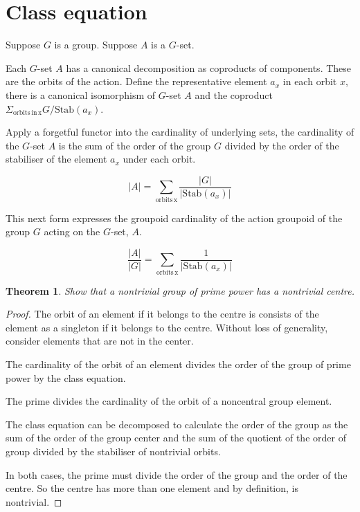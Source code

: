\documentclass{tufte-book}
\newtheorem{theorem}{Theorem}
\begin{document}
\section{Class equation}


Suppose $G$ is a group. Suppose $A$ is a $G$-set.

Each $G$-set $A$ has a canonical decomposition as coproducts of components. These are the orbits of the action. Define the representative element $a_x$ in each orbit $x$, there is a canonical isomorphism of $G$-set $A$ and the coproduct $\Sigma_{\mathrm{orbits \, in \, x}} G / \mathrm{Stab}(a_x)$.

Apply a forgetful functor into the cardinality of underlying sets, the cardinality of the $G$-set $A$ is the sum of the order of the group $G$ divided by the order of the stabiliser of the element $a_x$ under each orbit.

\begin{equation}
  |A| = \sum_{\mathrm{orbits \, x}}
  \dfrac{|G|}{|\mathrm{Stab}(a_x)|}
\end{equation}

This next form expresses the groupoid cardinality of the action groupoid of the group $G$ acting on the $G$-set, $A$.

\begin{equation}
  \dfrac{|A|}{|G|} = \sum_{\mathrm{orbits \, x}}
  \dfrac{1}{|\mathrm{Stab}(a_x)|}
\end{equation}

\begin{theorem}
  Show that a nontrivial group of prime power has a nontrivial centre.
\end{theorem}

\begin{proof}
  The orbit of an element if it belongs to the centre is consists of the element as a singleton if it belongs to the centre. Without loss of generality, consider elements that are not in the center.

  The cardinality of the orbit of an element divides the order of the group of prime power by the class equation. 
  
  The prime divides the cardinality of the orbit of a noncentral group element. 
  
  The class equation can be decomposed to calculate the order of the group as the sum of the order of the group center and the sum of the quotient of the order of group divided by the stabiliser of nontrivial orbits. 
  
  In both cases, the prime must divide the order of the group and the order of the centre. So the centre has more than one element and by definition, is nontrivial.
\end{proof}
\end{document}
